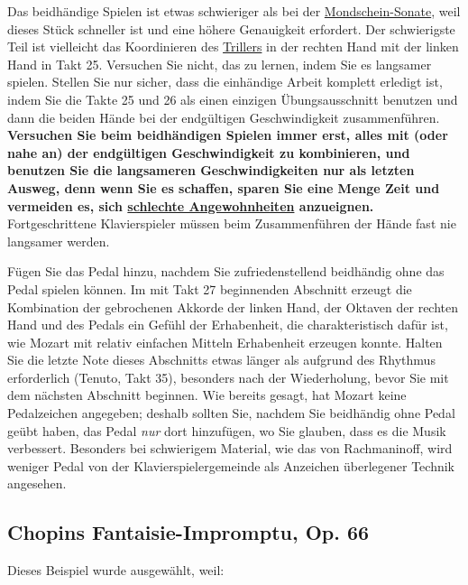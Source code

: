 Das beidhändige Spielen ist etwas schwieriger als bei der \hyperlink{c1ii25b}{Mondschein-Sonate}, weil dieses Stück schneller ist und eine höhere Genauigkeit erfordert.
Der schwierigste Teil ist vielleicht das Koordinieren des \hyperlink{c1iii3}{Trillers} in der rechten Hand mit der linken Hand in Takt 25.
Versuchen Sie nicht, das zu lernen, indem Sie es langsamer spielen.
Stellen Sie nur sicher, dass die einhändige Arbeit komplett erledigt ist, indem Sie die Takte 25 und 26 als einen einzigen Übungsausschnitt benutzen und dann die beiden Hände bei der endgültigen Geschwindigkeit zusammenführen.
\textbf{Versuchen Sie beim beidhändigen Spielen immer erst, alles mit (oder nahe an) der endgültigen Geschwindigkeit zu kombinieren, 
und benutzen Sie die langsameren Geschwindigkeiten nur als letzten Ausweg, denn wenn Sie es schaffen, sparen Sie eine Menge Zeit und vermeiden es, sich \hyperlink{c1ii22}{schlechte Angewohnheiten} anzueignen.}
Fortgeschrittene Klavierspieler müssen beim Zusammenführen der Hände fast nie langsamer werden.

Fügen Sie das Pedal hinzu, nachdem Sie zufriedenstellend beidhändig ohne das Pedal spielen können.
Im mit Takt 27 beginnenden Abschnitt erzeugt die Kombination der gebrochenen Akkorde der linken Hand, der Oktaven der rechten Hand und des Pedals ein Gefühl der Erhabenheit, die charakteristisch dafür ist, wie Mozart mit relativ einfachen Mitteln Erhabenheit erzeugen konnte.
Halten Sie die letzte Note dieses Abschnitts etwas länger als aufgrund des Rhythmus erforderlich (Tenuto, Takt 35), besonders nach der Wiederholung, bevor Sie mit dem nächsten Abschnitt beginnen.
Wie bereits gesagt, hat Mozart keine Pedalzeichen angegeben; deshalb sollten Sie, nachdem Sie beidhändig ohne Pedal geübt haben, das Pedal \textit{nur} dort hinzufügen, wo Sie glauben, dass es die Musik verbessert.
Besonders bei schwierigem Material, wie das von Rachmaninoff, wird weniger Pedal von der Klavierspielergemeinde als Anzeichen überlegener Technik angesehen.


\hypertarget{FI}{}
\subsection{Chopins Fantaisie-Impromptu, Op. 66}\hypertarget{c1ii25d}{}

Dieses Beispiel wurde ausgewählt, weil:

